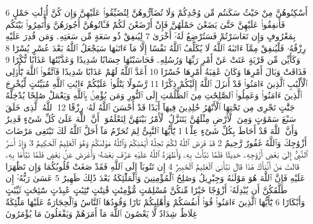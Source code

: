 {\tiny\colorbox{cl_aya}{6}} أَسْكِنُوهُنَّ مِنْ حَيْثُ سَكَنتُم مِّن وُجْدِكُمْ وَلَا تُضَآرُّوهُنَّ لِتُضَيِّقُوا۟ عَلَيْهِنَّ وَإِن كُنَّ أُو۟لَٰتِ حَمْلٍ فَأَنفِقُوا۟ عَلَيْهِنَّ حَتَّىٰ يَضَعْنَ حَمْلَهُنَّ فَإِنْ أَرْضَعْنَ لَكُمْ فَـَٔاتُوهُنَّ أُجُورَهُنَّ وَأْتَمِرُوا۟ بَيْنَكُم بِمَعْرُوفٍ وَإِن تَعَاسَرْتُمْ فَسَتُرْضِعُ لَهُۥٓ أُخْرَىٰ
{\tiny\colorbox{cl_aya}{7}} لِيُنفِقْ ذُو سَعَةٍ مِّن سَعَتِهِۦ وَمَن قُدِرَ عَلَيْهِ رِزْقُهُۥ فَلْيُنفِقْ مِمَّآ ءَاتَىٰهُ ٱللَّهُ لَا يُكَلِّفُ ٱللَّهُ نَفْسًا إِلَّا مَآ ءَاتَىٰهَا سَيَجْعَلُ ٱللَّهُ بَعْدَ عُسْرٍ يُسْرًا
{\tiny\colorbox{cl_aya}{8}} وَكَأَيِّن مِّن قَرْيَةٍ عَتَتْ عَنْ أَمْرِ رَبِّهَا وَرُسُلِهِۦ فَحَاسَبْنَٰهَا حِسَابًا شَدِيدًا وَعَذَّبْنَٰهَا عَذَابًا نُّكْرًا
{\tiny\colorbox{cl_aya}{9}} فَذَاقَتْ وَبَالَ أَمْرِهَا وَكَانَ عَٰقِبَةُ أَمْرِهَا خُسْرًا
{\tiny\colorbox{cl_aya}{10}} أَعَدَّ ٱللَّهُ لَهُمْ عَذَابًا شَدِيدًا فَٱتَّقُوا۟ ٱللَّهَ يَٰٓأُو۟لِى ٱلْأَلْبَٰبِ ٱلَّذِينَ ءَامَنُوا۟ قَدْ أَنزَلَ ٱللَّهُ إِلَيْكُمْ ذِكْرًا
{\tiny\colorbox{cl_aya}{11}} رَّسُولًا يَتْلُوا۟ عَلَيْكُمْ ءَايَٰتِ ٱللَّهِ مُبَيِّنَٰتٍ لِّيُخْرِجَ ٱلَّذِينَ ءَامَنُوا۟ وَعَمِلُوا۟ ٱلصَّٰلِحَٰتِ مِنَ ٱلظُّلُمَٰتِ إِلَى ٱلنُّورِ وَمَن يُؤْمِنۢ بِٱللَّهِ وَيَعْمَلْ صَٰلِحًا يُدْخِلْهُ جَنَّٰتٍ تَجْرِى مِن تَحْتِهَا ٱلْأَنْهَٰرُ خَٰلِدِينَ فِيهَآ أَبَدًا قَدْ أَحْسَنَ ٱللَّهُ لَهُۥ رِزْقًا
{\tiny\colorbox{cl_aya}{12}} ٱللَّهُ ٱلَّذِى خَلَقَ سَبْعَ سَمَٰوَٰتٍ وَمِنَ ٱلْأَرْضِ مِثْلَهُنَّ يَتَنَزَّلُ ٱلْأَمْرُ بَيْنَهُنَّ لِتَعْلَمُوٓا۟ أَنَّ ٱللَّهَ عَلَىٰ كُلِّ شَىْءٍ قَدِيرٌ وَأَنَّ ٱللَّهَ قَدْ أَحَاطَ بِكُلِّ شَىْءٍ عِلْمًۢا
{\tiny\colorbox{cl_aya}{1}} يَٰٓأَيُّهَا ٱلنَّبِىُّ لِمَ تُحَرِّمُ مَآ أَحَلَّ ٱللَّهُ لَكَ تَبْتَغِى مَرْضَاتَ أَزْوَٰجِكَ وَٱللَّهُ غَفُورٌ رَّحِيمٌ
{\tiny\colorbox{cl_aya}{2}} قَدْ فَرَضَ ٱللَّهُ لَكُمْ تَحِلَّةَ أَيْمَٰنِكُمْ وَٱللَّهُ مَوْلَىٰكُمْ وَهُوَ ٱلْعَلِيمُ ٱلْحَكِيمُ
{\tiny\colorbox{cl_aya}{3}} وَإِذْ أَسَرَّ ٱلنَّبِىُّ إِلَىٰ بَعْضِ أَزْوَٰجِهِۦ حَدِيثًا فَلَمَّا نَبَّأَتْ بِهِۦ وَأَظْهَرَهُ ٱللَّهُ عَلَيْهِ عَرَّفَ بَعْضَهُۥ وَأَعْرَضَ عَنۢ بَعْضٍ فَلَمَّا نَبَّأَهَا بِهِۦ قَالَتْ مَنْ أَنۢبَأَكَ هَٰذَا قَالَ نَبَّأَنِىَ ٱلْعَلِيمُ ٱلْخَبِيرُ
{\tiny\colorbox{cl_aya}{4}} إِن تَتُوبَآ إِلَى ٱللَّهِ فَقَدْ صَغَتْ قُلُوبُكُمَا وَإِن تَظَٰهَرَا عَلَيْهِ فَإِنَّ ٱللَّهَ هُوَ مَوْلَىٰهُ وَجِبْرِيلُ وَصَٰلِحُ ٱلْمُؤْمِنِينَ وَٱلْمَلَٰٓئِكَةُ بَعْدَ ذَٰلِكَ ظَهِيرٌ
{\tiny\colorbox{cl_aya}{5}} عَسَىٰ رَبُّهُۥٓ إِن طَلَّقَكُنَّ أَن يُبْدِلَهُۥٓ أَزْوَٰجًا خَيْرًا مِّنكُنَّ مُسْلِمَٰتٍ مُّؤْمِنَٰتٍ قَٰنِتَٰتٍ تَٰٓئِبَٰتٍ عَٰبِدَٰتٍ سَٰٓئِحَٰتٍ ثَيِّبَٰتٍ وَأَبْكَارًا
{\tiny\colorbox{cl_aya}{6}} يَٰٓأَيُّهَا ٱلَّذِينَ ءَامَنُوا۟ قُوٓا۟ أَنفُسَكُمْ وَأَهْلِيكُمْ نَارًا وَقُودُهَا ٱلنَّاسُ وَٱلْحِجَارَةُ عَلَيْهَا مَلَٰٓئِكَةٌ غِلَاظٌ شِدَادٌ لَّا يَعْصُونَ ٱللَّهَ مَآ أَمَرَهُمْ وَيَفْعَلُونَ مَا يُؤْمَرُونَ
